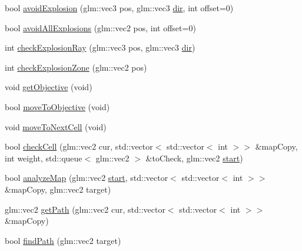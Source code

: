 \begin{DoxyCompactItemize}
\item 
bool \mbox{\hyperlink{class_game_1_1_component_1_1_i_a_a326ade34932f252ba16e75f40b769f1b}{avoid\+Explosion}} (glm\+::vec3 pos, glm\+::vec3 \mbox{\hyperlink{class_game_1_1_component_1_1_i_a_a4996d461d576a2ffff66e4b33d9d84e2}{dir}}, int offset=0)
\item 
bool \mbox{\hyperlink{class_game_1_1_component_1_1_i_a_a3a459eda48a6cd131da8164842250c43}{avoid\+All\+Explosions}} (glm\+::vec2 pos, int offset=0)
\item 
int \mbox{\hyperlink{class_game_1_1_component_1_1_i_a_a006b992ca7952c4977a04febbc19f882}{check\+Explosion\+Ray}} (glm\+::vec3 pos, glm\+::vec3 \mbox{\hyperlink{class_game_1_1_component_1_1_i_a_a4996d461d576a2ffff66e4b33d9d84e2}{dir}})
\item 
int \mbox{\hyperlink{class_game_1_1_component_1_1_i_a_ae6173c1d64a875181fe59b46ae609d91}{check\+Explosion\+Zone}} (glm\+::vec2 pos)
\item 
void \mbox{\hyperlink{class_game_1_1_component_1_1_i_a_a01c2575295fff1a6c3c0314d4edc0266}{get\+Objective}} (void)
\item 
bool \mbox{\hyperlink{class_game_1_1_component_1_1_i_a_a18e08cf56c2cd6a6d57aeb7eff48bb4c}{move\+To\+Objective}} (void)
\item 
void \mbox{\hyperlink{class_game_1_1_component_1_1_i_a_ac3951dbcb02fd5f34160becaad1bb962}{move\+To\+Next\+Cell}} (void)
\item 
bool \mbox{\hyperlink{class_game_1_1_component_1_1_i_a_afb045de0879ac649137bfac7c11e3c52}{check\+Cell}} (glm\+::vec2 cur, std\+::vector$<$ std\+::vector$<$ int $>$$>$ \&map\+Copy, int weight, std\+::queue$<$ glm\+::vec2 $>$ \&to\+Check, glm\+::vec2 \mbox{\hyperlink{class_game_1_1_component_1_1_i_a_ab440dc76a8837e291f6545e0dd15c819}{start}})
\item 
bool \mbox{\hyperlink{class_game_1_1_component_1_1_i_a_ace576ddf2bbb22b3a3462db04e99b8df}{analyze\+Map}} (glm\+::vec2 \mbox{\hyperlink{class_game_1_1_component_1_1_i_a_ab440dc76a8837e291f6545e0dd15c819}{start}}, std\+::vector$<$ std\+::vector$<$ int $>$$>$ \&map\+Copy, glm\+::vec2 target)
\item 
glm\+::vec2 \mbox{\hyperlink{class_game_1_1_component_1_1_i_a_addb635c6c68490214abd843fd07fdb12}{get\+Path}} (glm\+::vec2 cur, std\+::vector$<$ std\+::vector$<$ int $>$$>$ \&map\+Copy)
\item 
bool \mbox{\hyperlink{class_game_1_1_component_1_1_i_a_aa7027727099c16dc0727459382858631}{find\+Path}} (glm\+::vec2 target)
\end{DoxyCompactItemize}
